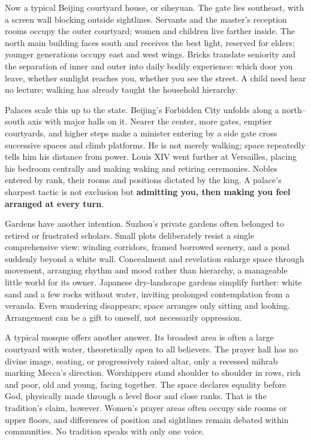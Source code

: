 Now a typical Beijing courtyard house, or siheyuan. The gate lies southeast, with a screen wall blocking outside sightlines. Servants and the master's reception rooms occupy the outer courtyard; women and children live farther inside. The north main building faces south and receives the best light, reserved for elders; younger generations occupy east and west wings. Bricks translate seniority and the separation of inner and outer into daily bodily experience: which door you leave, whether sunlight reaches you, whether you see the street. A child need hear no lecture; walking has already taught the household hierarchy.

Palaces scale this up to the state. Beijing's Forbidden City unfolds along a north--south axis with major halls on it. Nearer the center, more gates, emptier courtyards, and higher steps make a minister entering by a side gate cross successive spaces and climb platforms. He is not merely walking; space repeatedly tells him his distance from power. Louis XIV went further at Versailles, placing his bedroom centrally and making waking and retiring ceremonies. Nobles entered by rank, their rooms and positions dictated by the king. A palace's sharpest tactic is not exclusion but \textbf{admitting you, then making you feel arranged at every turn}.

Gardens have another intention. Suzhou's private gardens often belonged to retired or frustrated scholars. Small plots deliberately resist a single comprehensive view: winding corridors, framed borrowed scenery, and a pond suddenly beyond a white wall. Concealment and revelation enlarge space through movement, arranging rhythm and mood rather than hierarchy, a manageable little world for its owner. Japanese dry-landscape gardens simplify further: white sand and a few rocks without water, inviting prolonged contemplation from a veranda. Even wandering disappears; space arranges only sitting and looking. Arrangement can be a gift to oneself, not necessarily oppression.

A typical mosque offers another answer. Its broadest area is often a large courtyard with water, theoretically open to all believers. The prayer hall has no divine image, seating, or progressively raised altar, only a recessed mihrab marking Mecca's direction. Worshippers stand shoulder to shoulder in rows, rich and poor, old and young, facing together. The space declares equality before God, physically made through a level floor and close ranks. That is the tradition's claim, however. Women's prayer areas often occupy side rooms or upper floors, and differences of position and sightlines remain debated within communities. No tradition speaks with only one voice.

